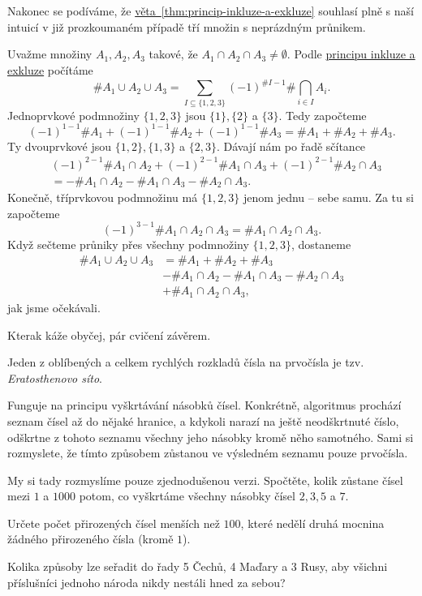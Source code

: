Nakonec se podíváme, že
\hyperref[thm:princip-inkluze-a-exkluze]{věta~\ref*{thm:princip-inkluze-a-exkluze}}
souhlasí plně s naší intuicí v již prozkoumaném případě tří množin s neprázdným
průnikem.

\begin{example}
 Uvažme množiny $A_1,A_2,A_3$ takové, že $A_1 \cap A_2 \cap A_3 \neq \emptyset$.
 Podle \hyperref[thm:princip-inkluze-a-exkluze]{principu inkluze a exkluze}
 počítáme
 \[
  \# A_1 \cup A_2 \cup A_3 = \sum_{I \subseteq \{1,2,3\}}^{} (-1)^{\#I - 1}\#
  \bigcap_{i \in  I}^{} A_i.
 \]
 Jednoprvkové podmnožiny $\{1,2,3\}$ jsou $\{1\}, \{2\}$ a $\{3\}$. Tedy
 započteme
 \[
  (-1)^{1-1} \# A_1 + (-1)^{1-1}\# A_2 + (-1)^{1-1}\# A_3 = \# A_1 + \# A_2 + \#
  A_3.
 \]
 Ty dvouprvkové jsou $\{1,2\}, \{1,3\}$ a $\{2,3\}$. Dávají nám po řadě sčítance
 \begin{align*}
  &(-1)^{2-1}\# A_1 \cap A_2 + (-1)^{2-1}\# A_1 \cap A_3 + (-1)^{2-1}\# A_2 \cap
  A_3\\
  &= -\# A_1 \cap A_2 - \# A_1 \cap A_3 - \#A_2 \cap A_3.
 \end{align*}
 Konečně, tříprvkovou podmnožinu má $\{1,2,3\}$ jenom jednu -- sebe samu. Za tu
 si započteme
 \[
  (-1)^{3-1}\#A_1 \cap A_2 \cap A_3 = \# A_1 \cap A_2 \cap A_3.
 \]
 Když sečteme průniky přes všechny podmnožiny $\{1,2,3\}$, dostaneme
 \begin{align*}
  \# A_1 \cup A_2 \cup A_3 &= \#A_1 + \#A_2 + \#A_3\\
  &-\#A_1 \cap A_2 - \#A_1 \cap A_3 - \#A_2 \cap A_3\\
  &+ \# A_1 \cap A_2 \cap A_3,
 \end{align*}
 jak jsme očekávali.
\end{example}

Kterak káže obyčej, pár cvičení závěrem.

\begin{exercise}
 Jeden z oblíbených a celkem rychlých rozkladů čísla na prvočísla je tzv.
 \emph{Eratosthenovo síto}.
 
 Funguje na principu vyškrtávání násobků čísel. Konkrétně, algoritmus prochází
 seznam čísel až do nějaké hranice, a kdykoli narazí na ještě neodškrtnuté
 číslo, odškrtne z tohoto seznamu všechny jeho násobky kromě něho samotného.
 Sami si rozmyslete, že tímto způsobem zůstanou ve výsledném seznamu pouze
 prvočísla.

 My si tady rozmyslíme pouze zjednodušenou verzi. Spočtěte, kolik zůstane čísel
 mezi $1$ a $1000$ potom, co vyškrtáme všechny násobky čísel $2,3,5$ a $7$.
\end{exercise}

\begin{exercise}
 Určete počet přirozených čísel menších než $100$, které nedělí druhá mocnina
 žádného přirozeného čísla (kromě $1$).
\end{exercise}

\begin{exercise}
 Kolika způsoby lze seřadit do řady 5 Čechů, 4 Maďary a 3 Rusy, aby všichni
 příslušníci jednoho národa nikdy nestáli hned za sebou?
\end{exercise}
